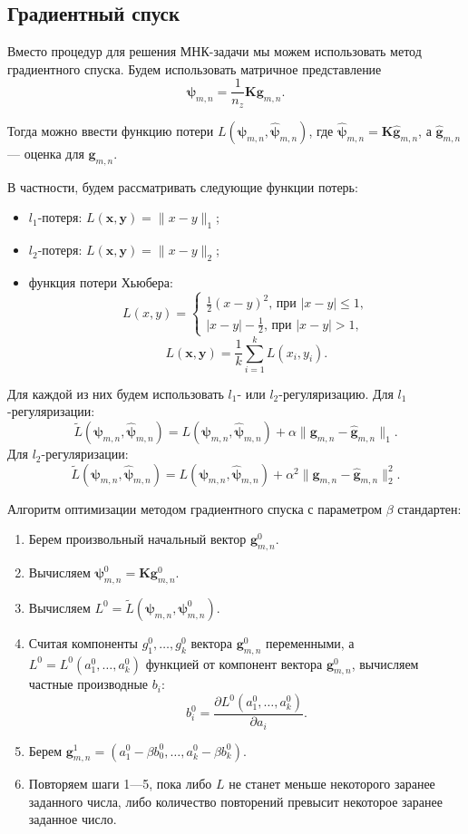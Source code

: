 \documentclass[../paper.tex]{subfiles}
\begin{document}
\subsection{Градиентный спуск}
Вместо процедур для решения МНК-задачи мы можем использовать метод градиентного
спуска. Будем использовать матричное представление
\[
	\bm{\psi}_{m,n} = \frac{1}{n_z} \bm{K} \bm{g}_{m,n}
.\]

Тогда можно ввести функцию потери $L(\bm{\psi}_{m,n}, \bm{\hat{\psi}}_{m,n})$,
где $\bm{\hat{\psi}}_{m,n} = \bm{K} \bm{\hat{g}}_{m,n}$, а $\bm{\hat{g}}_{m,n}$ ---
оценка для $\bm{g}_{m,n}$.

В частности, будем рассматривать следующие функции потерь:
\begin{itemize}
\item $l_1$-потеря: $L(\bm{x}, \bm{y}) = \| x - y \|_1$;
\item $l_2$-потеря: $L(\bm{x}, \bm{y}) = \| x - y \|_2$;
\item функция потери Хьюбера:
  \[
    L(x, y) =
    \begin{cases}
      \frac{1}{2} (x-y)^2 \text{, при $|x-y| \leqslant 1$}, \\
      |x-y| - \frac{1}{2} \text{, при $|x-y| > 1$},
    \end{cases}
  \]
  \[
    L(\bm{x}, \bm{y}) = \frac{1}{k} \sum_{i=1}^k L(x_i, y_i).
  \]
\end{itemize}

Для каждой из них будем использовать $l_1$- или $l_2$-регуляризацию. Для $l_1$-регуляризации:
\[
	\tilde{L}(\bm{\psi}_{m,n}, \bm{\hat{\psi}}_{m,n}) = L(\bm{\psi}_{m,n}, \bm{\hat{\psi}}_{m,n}) + \alpha \| \bm{g}_{m,n} - \bm{\hat{g}}_{m,n} \|_1
.\]
Для $l_2$-регуляризации:
\[
	\tilde{L}(\bm{\psi}_{m,n}, \bm{\hat{\psi}}_{m,n}) = L(\bm{\psi}_{m,n}, \bm{\hat{\psi}}_{m,n}) + \alpha^2 \| \bm{g}_{m,n} - \bm{\hat{g}}_{m,n} \|_2^2
.\]

Алгоритм оптимизации методом градиентного спуска с параметром $\beta$ стандартен:
\begin{enumerate}
	\item Берем произвольный начальный вектор $\bm{g}_{m,n}^0$.
	\item Вычисляем $\bm{\psi}_{m,n}^0 = \bm{K}\bm{g}_{m,n}^0$.
	\item Вычисляем $L^0 = \tilde{L}(\bm{\psi}_{m,n}, \bm{\psi}_{m,n}^0)$.
	\item Считая компоненты $g_1^0, \dots, g_k^0$ вектора $\bm{g}_{m,n}^0$ переменными, 
		а $L^0 = L^0(a_1^0, \dots, a_k^0)$ функцией от компонент вектора $\bm{g}_{m,n}^0$, вычисляем частные производные $b_i$:
		\[
			b_i^0 = \frac{\partial L^0(a_1^0, \dots, a_k^0)}{\partial a_i}
		.\]
	\item Берем $\bm{g}_{m,n}^1 = (a_1^0 - \beta b_0^0, \dots, a_k^0 - \beta b_k^0)$.
	\item Повторяем шаги 1---5, пока либо $L$ не станет меньше некоторого заранее заданного числа,
		либо количество повторений превысит некоторое заранее заданное число.
\end{enumerate}
\end{document}

